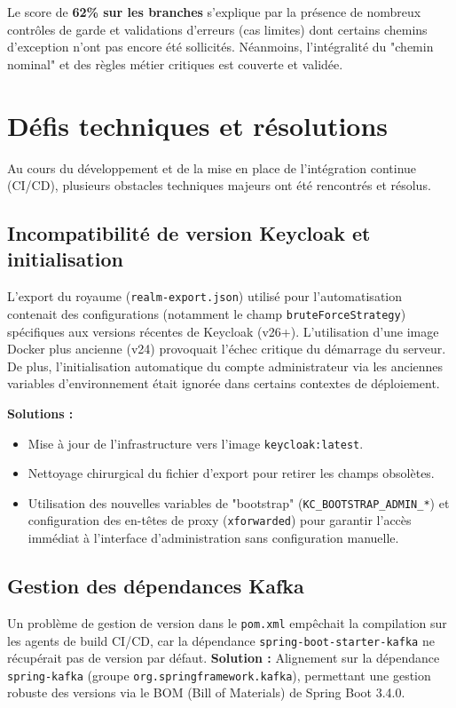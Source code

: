 \documentclass[12pt,a4paper]{article}
\begin{document}
Le score de \textbf{62\% sur les branches} s'explique par la présence de nombreux contrôles de garde et validations d'erreurs (cas limites) dont certains chemins d'exception n'ont pas encore été sollicités. Néanmoins, l'intégralité du "chemin nominal" et des règles métier critiques est couverte et validée.

\newpage
\section{Défis techniques et résolutions}

Au cours du développement et de la mise en place de l'intégration continue (CI/CD), plusieurs obstacles techniques majeurs ont été rencontrés et résolus.

\subsection{Incompatibilité de version Keycloak et initialisation}
L'export du royaume (\texttt{realm-export.json}) utilisé pour l'automatisation contenait des configurations (notamment le champ \texttt{bruteForceStrategy}) spécifiques aux versions récentes de Keycloak (v26+). L'utilisation d'une image Docker plus ancienne (v24) provoquait l'échec critique du démarrage du serveur. De plus, l'initialisation automatique du compte administrateur via les anciennes variables d'environnement était ignorée dans certains contextes de déploiement.

\textbf{Solutions :} 
\begin{itemize}
    \item Mise à jour de l'infrastructure vers l'image \texttt{keycloak:latest}.
    \item Nettoyage chirurgical du fichier d'export pour retirer les champs obsolètes.
    \item Utilisation des nouvelles variables de "bootstrap" (\texttt{KC\_BOOTSTRAP\_ADMIN\_*}) et configuration des en-têtes de proxy (\texttt{xforwarded}) pour garantir l'accès immédiat à l'interface d'administration sans configuration manuelle.
\end{itemize}

\subsection{Gestion des dépendances Kafka}
Un problème de gestion de version dans le \texttt{pom.xml} empêchait la compilation sur les agents de build CI/CD, car la dépendance \texttt{spring-boot-starter-kafka} ne récupérait pas de version par défaut.
\textbf{Solution :} Alignement sur la dépendance \texttt{spring-kafka} (groupe \texttt{org.springframework.kafka}), permettant une gestion robuste des versions via le BOM (Bill of Materials) de Spring Boot 3.4.0.
\end{document}
